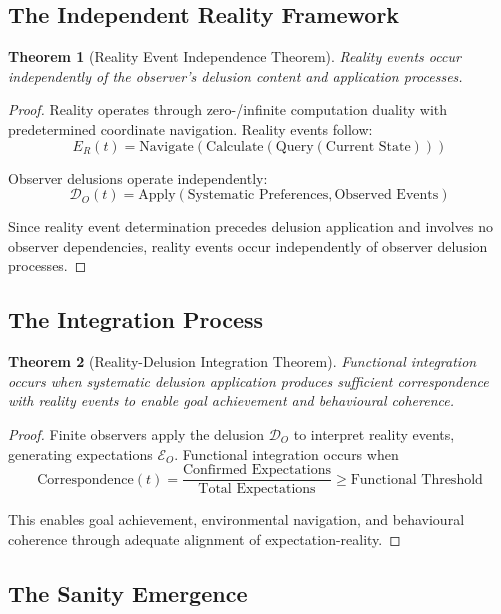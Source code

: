 \documentclass[12pt,a4paper]{article}
\newtheorem{theorem}{Theorem}[section]
\begin{document}
\subsection{The Independent Reality Framework}

\begin{theorem}[Reality Event Independence Theorem]
Reality events occur independently of the observer's delusion content and application processes.
\end{theorem}

\begin{proof}
Reality operates through zero-/infinite computation duality with predetermined coordinate navigation. Reality events follow:
$$E_R(t) = \text{Navigate}(\text{Calculate}(\text{Query}(\text{Current State})))$$

Observer delusions operate independently:
$$\mathcal{D}_O(t) = \text{Apply}(\text{Systematic Preferences}, \text{Observed Events})$$

Since reality event determination precedes delusion application and involves no observer dependencies, reality events occur independently of observer delusion processes.
\end{proof}

\subsection{The Integration Process}

\begin{theorem}[Reality-Delusion Integration Theorem]
Functional integration occurs when systematic delusion application produces sufficient correspondence with reality events to enable goal achievement and behavioural coherence.
\end{theorem}

\begin{proof}
Finite observers apply the delusion $\mathcal{D}_O$ to interpret reality events, generating expectations $\mathcal{E}_O$. Functional integration occurs when
$$\text{Correspondence}(t) = \frac{\text{Confirmed Expectations}}{\text{Total Expectations}} \geq \text{Functional Threshold}$$

This enables goal achievement, environmental navigation, and behavioural coherence through adequate alignment of expectation-reality.
\end{proof}

\subsection{The Sanity Emergence}
\end{document}
